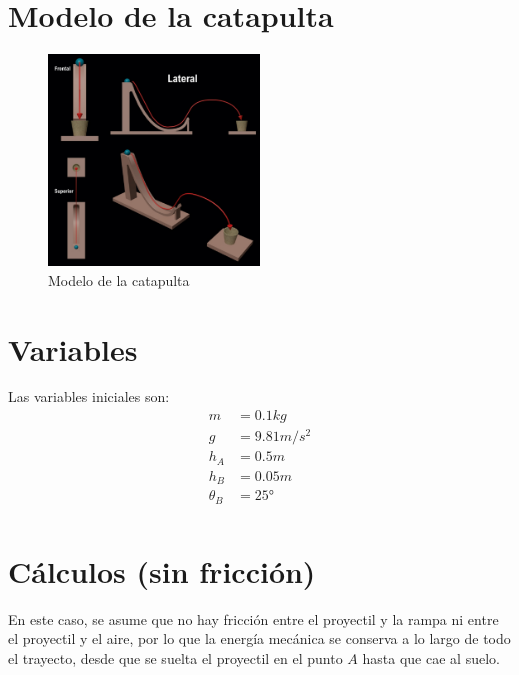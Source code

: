 \documentclass{article}
\begin{document}
        \section{Modelo de la catapulta}
        \begin{figure}[H]
            \centering
            \includegraphics[width=0.5\textwidth]{figures/catapulta.jpeg}
            \caption{Modelo de la catapulta}
        \end{figure}
        \section{Variables}
        Las variables iniciales son:
        \begin{align*}
            m &= 0.1 \si{kg} \\
            g &= 9.81 \si{m/s^2} \\
            h_A &= 0.5 \si{m} \\
            h_B &= 0.05 \si{m} \\
            \theta_B &= 25 \si{\degree} \\
        \end{align*}
        
        \section{Cálculos (sin fricción)}
        En este caso, se asume que no hay fricción entre el proyectil y la rampa ni entre el proyectil y el aire, por lo que la energía mecánica se conserva a lo largo de todo el trayecto, desde que se suelta el proyectil en el punto $A$ hasta que cae al suelo.
\end{document}
